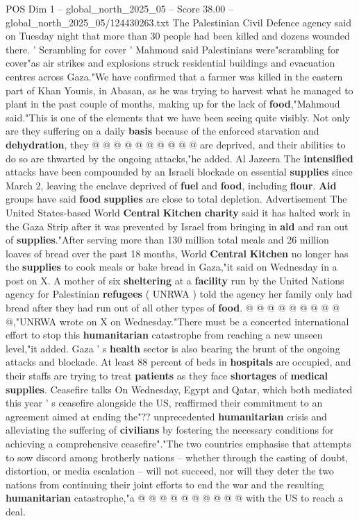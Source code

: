 \begin{textsample}{POS Dim 1 – global\_north\_2025\_05 – Score 38.00 – global\_north\_2025\_05/124430263.txt}
The Palestinian Civil Defence agency said on Tuesday night that more than 30 people had been killed and dozens wounded there. ' Scrambling for cover ' Mahmoud said Palestinians were"scrambling for cover"as air strikes and explosions struck residential buildings and evacuation centres across Gaza."We have confirmed that a farmer was killed in the eastern part of Khan Younis, in Abasan, as he was trying to harvest what he managed to plant in the past couple of months, making up for the lack of \textbf{food},"Mahmoud said."This is one of the elements that we have been seeing quite visibly.
Not only are they suffering on a daily \textbf{basis} because of the enforced starvation and \textbf{dehydration}, they @ @ @ @ @ @ @ @ @ @ are deprived, and their abilities to do so are thwarted by the ongoing attacks,"he added.
Al Jazeera The \textbf{intensified} attacks have been compounded by an Israeli blockade on essential \textbf{supplies} since March 2, leaving the enclave deprived of \textbf{fuel} and \textbf{food}, including \textbf{flour}. \textbf{Aid} groups have said \textbf{food} \textbf{supplies} are close to total depletion.
Advertisement The United States-based World \textbf{Central} \textbf{Kitchen} \textbf{charity} said it has halted work in the Gaza Strip after it was prevented by Israel from bringing in \textbf{aid} and ran out of \textbf{supplies}."After serving more than 130 million total meals and 26 million loaves of bread over the past 18 months, World \textbf{Central} \textbf{Kitchen} no longer has the \textbf{supplies} to cook meals or bake bread in Gaza,"it said on Wednesday in a post on X.
A mother of six \textbf{sheltering} at a \textbf{facility} run by the United Nations agency for Palestinian \textbf{refugees} ( UNRWA ) told the agency her family only had bread after they had run out of all other types of \textbf{food}. @ @ @ @ @ @ @ @ @ @,"UNRWA wrote on X on Wednesday."There must be a concerted international effort to stop this \textbf{humanitarian} catastrophe from reaching a new unseen level,"it added.
Gaza ' s \textbf{health} sector is also bearing the brunt of the ongoing attacks and blockade.
At least 88 percent of beds in \textbf{hospitals} are occupied, and their staffs are trying to treat \textbf{patients} as they face \textbf{shortages} of \textbf{medical} \textbf{supplies}.
Ceasefire talks On Wednesday, Egypt and Qatar, which both mediated this year ' s ceasefire alongside the US, reaffirmed their commitment to an agreement aimed at ending the"?? unprecedented \textbf{humanitarian} crisis and alleviating the suffering of \textbf{civilians} by fostering the necessary conditions for achieving a comprehensive ceasefire"."The two countries emphasise that attempts to sow discord among brotherly nations -- whether through the casting of doubt, distortion, or media escalation -- will not succeed, nor will they deter the two nations from continuing their joint efforts to end the war and the resulting \textbf{humanitarian} catastrophe,"a @ @ @ @ @ @ @ @ @ @ with the US to reach a deal.

\end{textsample}
